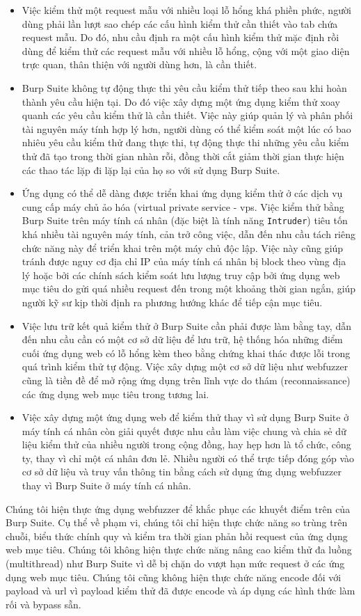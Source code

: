 \begin{itemize}
    \item Việc kiểm thử một request mẫu với nhiều loại lỗ hổng khá phiền phức, người dùng phải lần lượt sao chép các cấu hình kiểm thử cần thiết vào tab chứa request mẫu. Do đó, nhu cầu định ra một cấu hình kiểm thử mặc định rồi dùng để kiểm thử các request mẫu với nhiều lỗ hổng, cộng với một giao diện trực quan, thân thiện với người dùng hơn, là cần thiết.
    \item Burp Suite không tự động thực thi yêu cầu kiểm thử tiếp theo sau khi hoàn thành yêu cầu hiện tại. Do đó việc xây dựng một ứng dụng kiểm thử xoay quanh các yêu cầu kiểm thử là cần thiết. Việc này giúp quản lý và phân phối tài nguyên máy tính hợp lý hơn, người dùng có thể kiểm soát một lúc có bao nhiêu yêu cầu kiểm thử đang thực thi, tự động thực thi những yêu cầu kiểm thử đã tạo trong thời gian nhàn rỗi, đồng thời cắt giảm thời gian thực hiện các thao tác lặp đi lặp lại của họ so với sử dụng Burp Suite.
    \item Ứng dụng có thể dễ dàng được triển khai ứng dụng kiểm thử ở các dịch vụ cung cấp máy chủ ảo hóa (virtual private service - \acrshort{vps}. Việc kiểm thử bằng Burp Suite trên máy tính cá nhân (đặc biệt là tính năng \texttt{Intruder}) tiêu tốn khá nhiều tài nguyên máy tính, cản trở công việc, dẫn đến nhu cầu tách riêng chức năng này để triển khai trên một máy chủ độc lập. Việc này cũng giúp tránh được nguy cơ địa chỉ IP của máy tính cá nhân bị block theo vùng địa lý hoặc bởi các chính sách kiểm soát lưu lượng truy cập bởi ứng dụng web mục tiêu do gửi quá nhiều request đến trong một khoảng thời gian ngắn, giúp người kỹ sư kịp thời định ra phương hướng khác để tiếp cận mục tiêu.
    \item Việc lưu trữ kết quả kiểm thử ở Burp Suite cần phải được làm bằng tay, dẫn đến nhu cầu cần có một cơ sở dữ liệu để lưu trữ, hệ thống hóa những điểm cuối ứng dụng web có lỗ hổng kèm theo bằng chứng khai thác được lỗi trong quá trình kiểm thử tự động. Việc xây dựng một cơ sở dữ liệu như webfuzzer cũng là tiền đề để mở rộng ứng dụng trên lĩnh vực do thám (reconnaissance) các ứng dụng web mục tiêu trong tương lai.
    \item Việc xây dựng một ứng dụng web để kiểm thử thay vì sử dụng Burp Suite ở máy tính cá nhân còn giải quyết được nhu cầu làm việc chung và chia sẻ dữ liệu kiểm thử của nhiều người trong cộng đồng, hay hẹp hơn là tổ chức, công ty, thay vì chỉ một cá nhân đơn lẻ. Nhiều người có thể trực tiếp đóng góp vào cơ sở dữ liệu và truy vấn thông tin bằng cách sử dụng ứng dụng webfuzzer thay vì Burp Suite ở máy tính cá nhân.
\end{itemize}
Chúng tôi hiện thực ứng dụng webfuzzer để khắc phục các khuyết điểm trên của Burp Suite. Cụ thể về phạm vi, chúng tôi chỉ hiện thực chức năng so trùng trên chuỗi, biểu thức chính quy và kiểm tra thời gian phản hồi request của ứng dụng web mục tiêu. Chúng tôi không hiện thực chức năng nâng cao kiểm thử đa luồng (multithread) như Burp Suite vì dễ bị chặn do vượt hạn mức request ở các ứng dụng web mục tiêu. Chúng tôi cũng không hiện thực chức năng encode đối với payload và \acrshort{url} vì payload kiểm thử đã được encode và áp dụng các hình thức làm rối và bypass sẵn.